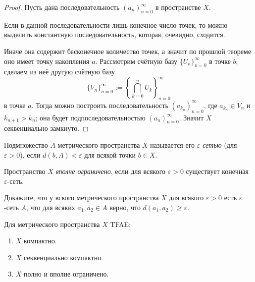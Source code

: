 \documentclass[12pt,a4paper]{article}
\begin{document}
    \begin{proof}
        Пусть дана последовательность $(a_n)_{n=0}^\infty$ в пространстве $X$.
        
        Если в данной последовательности лишь конечное число точек, то можно выделить константную последовательность, которая, очевидно, сходится.
        
        Иначе она содержит бесконечное количество точек, а значит по прошлой теореме оно имеет точку накопления $a$. Рассмотрим счётную базу $\{U_n\}_{n=0}^\infty$ в точке $b$; сделаем из неё другую счётную базу
        \[\{V_n\}_{n=0}^\infty := \left\{\bigcap_{k=0}^n U_k\right\}_{n=0}^\infty\]
        в точке $a$. Тогда можно построить последовательность $(a_{k_n})_{n=0}^\infty$, где $a_{k_n} \in V_n$ и $k_{n+1} > k_n$; она будет подпоследовательностью $(a_n)_{n=0}^\infty$. Значит $X$ секвенциально замкнуто.
    \end{proof}
    
    \begin{definition}
        Подмножество $A$ метрического пространства $X$ называется его \emph{$\varepsilon$-сетью} (для $\varepsilon > 0$), если $d(b, A) < \varepsilon$ для всякой точки $b \in X$.
    \end{definition}

    \begin{definition}
        Пространство $X$ \emph{вполне ограничено}, если для всякого $\varepsilon > 0$ существует конечная $\varepsilon$-сеть.
    \end{definition}

    \begin{exercise}
        Докажите, что у вского метрического пространства $X$ для всякого $\varepsilon > 0$ есть $\varepsilon$-сеть $A$, что для всяких $a_1, a_2 \in A$ верно, что $d(a_1, a_2) \geqslant \varepsilon$.
    \end{exercise}

    \begin{theorem}\label{compact_tern_theorem}
        Для метрического пространства $X$ TFAE:
        \begin{enumerate}
            \item $X$ компактно.
            \item $X$ секвенциально компактно.
            \item $X$ полно и вполне ограничено.
        \end{enumerate}
    \end{theorem}
    
\end{document}
